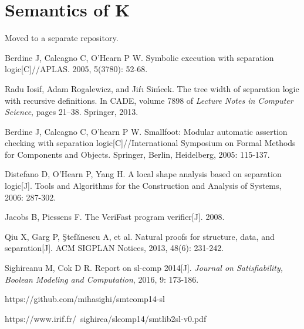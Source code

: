 \documentclass{article}
\theoremstyle{plain}
\begin{document}
\section{Semantics of K}

Moved to a separate repository.

\medskip
 
\begin{thebibliography}{9}
Berdine J, Calcagno C, O'Hearn P W. Symbolic execution with separation logic[C]//APLAS. 2005, 5(3780): 52-68.
 
Radu Iosif, Adam Rogalewicz, and Jiŕı Siḿcek. The tree width of separation logic with recursive definitions. In CADE, volume 7898 of \textit{Lecture Notes in Computer Science}, pages 21–38. Springer, 2013.
 
Berdine J, Calcagno C, O’hearn P W. Smallfoot: Modular automatic assertion checking with separation logic[C]//International Symposium on Formal Methods for Components and Objects. Springer, Berlin, Heidelberg, 2005: 115-137.

Distefano D, O’Hearn P, Yang H. A local shape analysis based on separation logic[J]. Tools and Algorithms for the Construction and Analysis of Systems, 2006: 287-302.

Jacobs B, Piessens F. The VeriFast program verifier[J]. 2008.

Qiu X, Garg P, Ştefănescu A, et al. Natural proofs for structure, data, and separation[J]. ACM SIGPLAN Notices, 2013, 48(6): 231-242.

Sighireanu M, Cok D R. Report on sl-comp 2014[J]. \textit{Journal on Satisfiability, Boolean Modeling and Computation}, 2016, 9: 173-186.

https://github.com/mihasighi/smtcomp14-sl

https://www.irif.fr/~sighirea/slcomp14/smtlib2sl-v0.pdf
\end{thebibliography}
\end{document}
